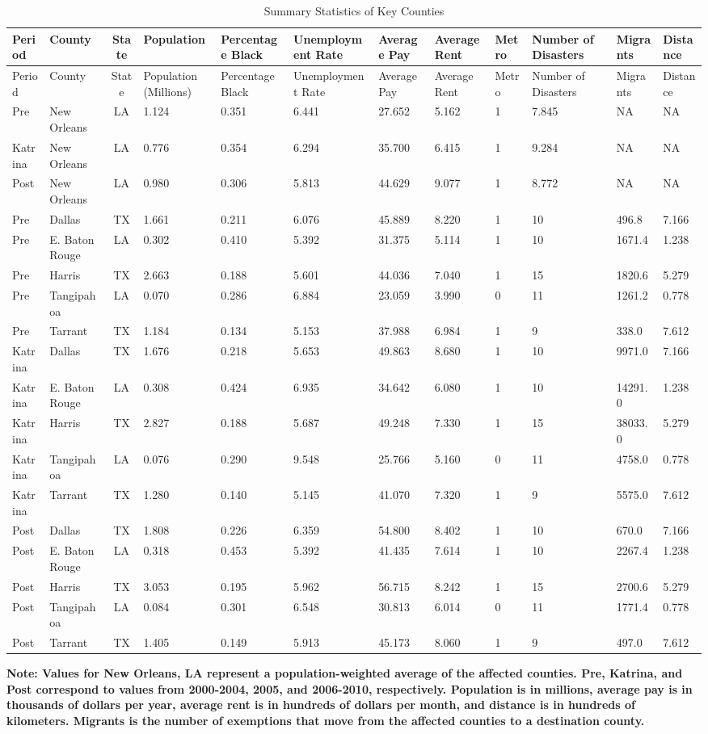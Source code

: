 \documentclass[]{article}
\begin{document}
\clearpage

\tiny{
\begin{longtable}[]{@{}l C{1.5cm} c  C{1.2cm} C{1.3cm}C{1.7cm} C{1.2cm}C{1.2cm} C{0.75cm} C{1.5cm}ll@{}} 
\caption{Summary Statistics of Key Counties
\label{tab:sumstatscounty}}  \tabularnewline
\toprule 
 Period & County & State & Population& Percentage Black
& Unemployment Rate & Average Pay & Average
Rent &  Metro & Number of Disasters & Migrants
 & Distance \tabularnewline
\midrule
\endfirsthead
\toprule
Period & County & State & Population (Millions) & Percentage Black
& Unemployment Rate & Average Pay  & Average
Rent & Metro & Number of Disasters & Migrants & Distance \tabularnewline
\midrule
\endhead
Pre & New Orleans & LA & 1.124 & 0.351 & 6.441 & 27.652 &
5.162 & 1 & 7.845 & NA & NA\tabularnewline
Katrina & New Orleans & LA & 0.776 & 0.354 & 6.294 & 35.700 &
6.415 & 1 & 9.284 & NA & NA\tabularnewline
Post & New Orleans & LA & 0.980 & 0.306 & 5.813 & 44.629
& 9.077 & 1 & 8.772 & NA & NA\tabularnewline
Pre & Dallas & TX & 1.661 & 0.211 & 6.076 & 45.889 & 8.220 &
1 & 10 & 496.8 & 7.166\tabularnewline
Pre & E. Baton Rouge & LA & 0.302 & 0.410 & 5.392 &
31.375 & 5.114 & 1 & 10 & 1671.4 & 1.238\tabularnewline
Pre & Harris & TX & 2.663 & 0.188 & 5.601 & 44.036 & 7.040 &
1 & 15 & 1820.6 & 5.279\tabularnewline
Pre & Tangipahoa & LA & 0.070 & 0.286 & 6.884 & 23.059 &
3.990 & 0 & 11 & 1261.2 & 0.778\tabularnewline
Pre & Tarrant & TX & 1.184 & 0.134 & 5.153 & 37.988 & 6.984 &
1 & 9 & 338.0 & 7.612\tabularnewline
Katrina & Dallas & TX & 1.676 & 0.218 & 5.653 & 49.863 & 8.680 & 1 &
10 & 9971.0 & 7.166\tabularnewline
Katrina & E. Baton Rouge & LA & 0.308 & 0.424 & 6.935 & 34.642
& 6.080 & 1 & 10 & 14291.0 & 1.238\tabularnewline
Katrina & Harris & TX & 2.827 & 0.188 & 5.687 & 49.248 & 7.330 & 1 &
15 & 38033.0 & 5.279\tabularnewline
Katrina & Tangipahoa & LA & 0.076 & 0.290 & 9.548 & 25.766 &
5.160 & 0 & 11 & 4758.0 & 0.778\tabularnewline
Katrina & Tarrant & TX & 1.280 & 0.140 & 5.145 & 41.070 & 7.320 & 1 &
9 & 5575.0 & 7.612\tabularnewline
Post & Dallas & TX & 1.808 & 0.226 & 6.359 & 54.800 & 8.402 &
1 & 10 & 670.0 & 7.166\tabularnewline
Post & E. Baton Rouge & LA & 0.318 & 0.453 & 5.392 &
41.435 & 7.614 & 1 & 10 & 2267.4 & 1.238\tabularnewline
Post & Harris & TX & 3.053 & 0.195 & 5.962 & 56.715 & 8.242 &
1 & 15 & 2700.6 & 5.279\tabularnewline
Post & Tangipahoa & LA & 0.084 & 0.301 & 6.548 & 30.813 &
6.014 & 0 & 11 & 1771.4 & 0.778\tabularnewline
Post & Tarrant & TX & 1.405 & 0.149 & 5.913 & 45.173 & 8.060
& 1 & 9 & 497.0 & 7.612\tabularnewline
\bottomrule
\end{longtable}
\begin{centering}
\textbf{Note: Values for New Orleans, LA represent a population-weighted average of the affected counties. Pre, Katrina, and Post correspond to values from 2000-2004, 2005, and 2006-2010, respectively. Population is in millions, average pay is in thousands of dollars per year, average rent is in hundreds of dollars per month, and distance is in hundreds of kilometers. Migrants is the number of exemptions that move from the affected counties to a destination county.}
\end{centering}
}
\clearpage
\end{document}
